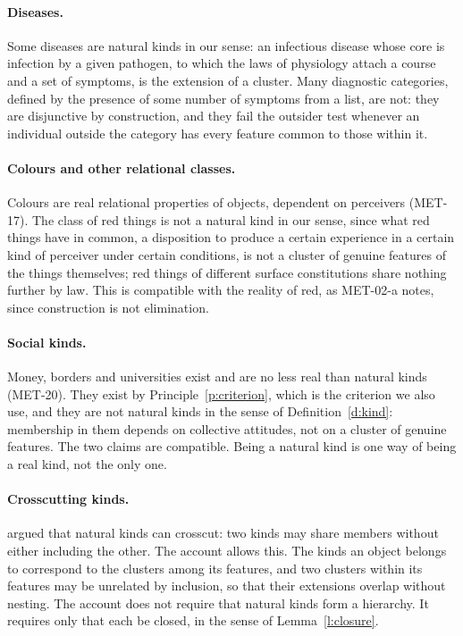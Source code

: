 \documentclass{situationist-preprint}
\begin{document}
\paragraph{Diseases.} Some diseases are natural kinds in our sense: an infectious disease whose core is infection by a given pathogen, to which the laws of physiology attach a course and a set of symptoms, is the extension of a cluster. Many diagnostic categories, defined by the presence of some number of symptoms from a list, are not: they are disjunctive by construction, and they fail the outsider test whenever an individual outside the category has every feature common to those within it.

\paragraph{Colours and other relational classes.} Colours are real relational properties of objects, dependent on perceivers (MET-17). The class of red things is not a natural kind in our sense, since what red things have in common, a disposition to produce a certain experience in a certain kind of perceiver under certain conditions, is not a cluster of genuine features of the things themselves; red things of different surface constitutions share nothing further by law. This is compatible with the reality of red, as MET-02-a notes, since construction is not elimination.

\paragraph{Social kinds.} Money, borders and universities exist and are no less real than natural kinds (MET-20). They exist by Principle~\ref{p:criterion}, which is the criterion we also use, and they are not natural kinds in the sense of Definition~\ref{d:kind}: membership in them depends on collective attitudes, not on a cluster of genuine features. The two claims are compatible. Being a natural kind is one way of being a real kind, not the only one.

\paragraph{Crosscutting kinds.} \citet{Khalidi1998} argued that natural kinds can crosscut: two kinds may share members without either including the other. The account allows this. The kinds an object belongs to correspond to the clusters among its features, and two clusters within its features may be unrelated by inclusion, so that their extensions overlap without nesting. The account does not require that natural kinds form a hierarchy. It requires only that each be closed, in the sense of Lemma~\ref{l:closure}.
\end{document}
